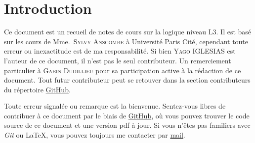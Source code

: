\section{Introduction}

Ce document est un recueil de notes de cours sur la logique niveau L3. Il est
basé sur les cours de Mme.~\textsc{Sylvy Anscombe} à Université Paris Cité, cependant toute
erreur ou inexactitude est de ma responsabilité.
Si bien \textsc{Yago IGLESIAS} est l'auteur de ce document, il n'est pas
le seul contributeur. Un remerciement particulier à \textsc{Gabin Dudillieu} pour sa
participation active à la rédaction de ce document. Tout futur contributeur
peut se retouver dans la section contributeurs du répertoire
\href{https://github.com/Yag000/logique-notes/graphs/contributors}{GitHub}.
\vspace{0.5cm}

Toute erreur signalée ou remarque est la bienvenue.
Sentez-vous libres de contribuer à ce document par le biais de \href{https://github.com/Yag000/logique-notes}{GitHub},
où vous pouvez trouver le code source de ce document et une version pdf à jour.
Si vous n'êtes pas familiers avec \textit{Git} ou \LaTeX, vous pouvez toujours me contacter
par \href{mailto: yago.iglesias.vazquez@gmail.com}{mail}.





